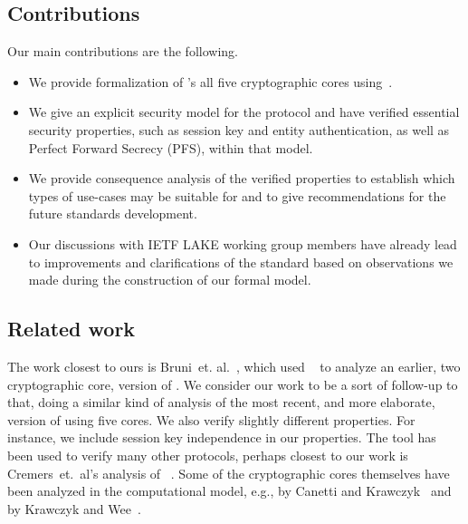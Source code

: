 \documentclass[runningheads,draft]{llncs}
\begin{document}
\subsection{Contributions}
\label{sec:contributions}
Our main contributions are the following.
\begin{itemize}
    \item We provide formalization of \mEdhoc's all five cryptographic cores
        using\linebreak \mTamarin~\cite{DBLP:conf/cav/MeierSCB13}.
    \item We give an explicit security model for the protocol and have verified
        essential security properties, such as session key and entity
        authentication, as well as Perfect Forward Secrecy (PFS), within that
        model.
    \item We provide consequence analysis of the verified properties to
        establish which types of use-cases \mEdhoc{} may be suitable for and
        to give recommendations for the future standards development.
    \item Our discussions with IETF LAKE working group members have already
        lead to improvements and clarifications of the standard \mSpec{} based
        on observations we made during the construction of our formal model.
\end{itemize}

\subsection{Related work}
\label{sec:relatedWork}
The work closest to ours is Bruni~et. al.~\cite{DBLP:conf/secsr/BruniJPS18},
which used \mProverif~\cite{DBLP:conf/csfw/Blanchet01} to analyze an earlier,
two cryptographic core, version of \mEdhoc.
%
We consider our work to be a sort of follow-up to that, doing a similar kind of
analysis of the most recent, and more elaborate, version of \mEdhoc{} using five
cores.
%
We also verify slightly different properties.
%
For instance, we include session key independence in our properties.
%
The \mTamarin{} tool has been used to verify many other protocols, perhaps closest
to our work is Cremers~et.~al's analysis of
\mTls~\cite{DBLP:conf/ccs/CremersHHSM17}.
%
Some of the cryptographic cores themselves have been analyzed in the
computational model, e.g., \mSigma{} by Canetti and
Krawczyk~\cite{DBLP:conf/crypto/CanettiK02} and \mOptls{} by Krawczyk and
Wee~\cite{DBLP:conf/eurosp/KrawczykW16}.
%
\end{document}
